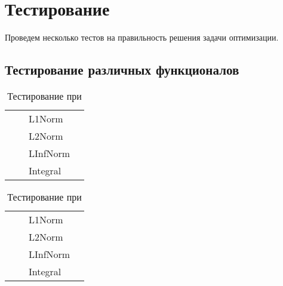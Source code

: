 \chapter{Тестирование}

Проведем несколько тестов на правильность решения задачи оптимизации.

\section{Тестирование различных функционалов}

\begin{table}
	\caption{Тестирование при }
	\centering
	\small
	\begin{tabularx}{1.0\textwidth}{| >{\raggedright\arraybackslash}X | >{\raggedright\arraybackslash}X | >{\raggedright\arraybackslash}X | >{\raggedright\arraybackslash}X |}
		\hline
		\centering{Входные точки}  & \centering{Функция} & \centering{Функционал} & \centering{Результат} \tabularnewline \hline    
		
		\multirow{4}{*}{\centering{(0.5; 0.5; 0.5)}} & \multirow{4}{*}{\centering{FFFFF}} & L1Norm & \centering{0.00000000E+000; 0.00000000E+000; 0.00000000E+000} \tabularnewline \cline{3-4}
		& & L2Norm & \centering{0.00000000E+000; 0.00000000E+000; 0.00000000E+000} \tabularnewline \cline{3-4}
		& & LInfNorm & \centering{0.00000000E+000; 0.00000000E+000; 0.00000000E+000} \tabularnewline \cline{3-4}
		& & Integral & \centering{0.00000000E+000; 0.00000000E+000; 0.00000000E+000} \tabularnewline \hline
	\end{tabularx}
	\label{tab:test1}
\end{table}

\begin{table}
	\caption{Тестирование при }
	\centering
	\small
	\begin{tabularx}{1.0\textwidth}{| >{\raggedright\arraybackslash}X | >{\raggedright\arraybackslash}X | >{\raggedright\arraybackslash}X | >{\raggedright\arraybackslash}X |}
		\hline
		\centering{Входные точки}  & \centering{Функция} & \centering{Функционал} & \centering{Результат} \tabularnewline \hline    
		
		\multirow{4}{*}{\centering{(0.5; 0.5; 0.5)}} & \multirow{4}{*}{\centering{FFFFF}} & L1Norm & \centering{0.00000000E+000; 0.00000000E+000; 0.00000000E+000} \tabularnewline \cline{3-4}
		& & L2Norm & \centering{0.00000000E+000; 0.00000000E+000; 0.00000000E+000} \tabularnewline \cline{3-4}
		& & LInfNorm & \centering{0.00000000E+000; 0.00000000E+000; 0.00000000E+000} \tabularnewline \cline{3-4}
		& & Integral & \centering{0.00000000E+000; 0.00000000E+000; 0.00000000E+000} \tabularnewline \hline
	\end{tabularx}
	\label{tab:test2}
\end{table}


